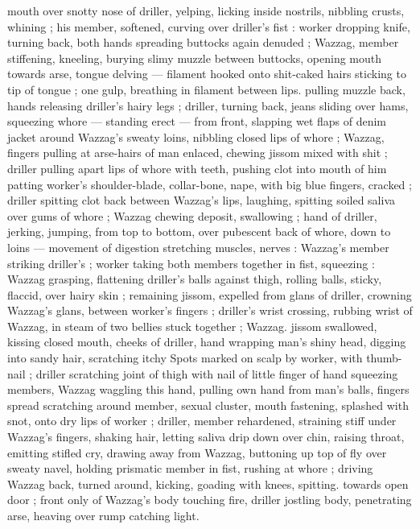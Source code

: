 mouth over snotty nose of driller, yelping, licking inside nostrils, 
nibbling crusts, whining ; his member, softened, curving over driller's 
fist : worker dropping knife, turning back, both hands spreading 
buttocks again denuded ; Wazzag, member stiffening, kneeling, 
burying slimy muzzle between buttocks, opening mouth towards 
arse, tongue delving --- filament hooked onto shit-caked hairs 
sticking to tip of tongue ; one gulp, breathing in filament between 
lips. pulling muzzle back, hands releasing driller's hairy legs ; driller, 
turning back, jeans sliding over hams, squeezing whore --- standing 
erect --- from front, slapping wet flaps of denim jacket around 
Wazzag's sweaty loins, nibbling closed lips of whore ; Wazzag, 
fingers pulling at arse-hairs of man enlaced, chewing jissom mixed 
with shit ; driller pulling apart lips of whore with teeth, pushing clot 
into mouth of him patting worker's shoulder-blade, collar-bone, 
nape, with big blue fingers, cracked ; driller spitting clot back 
between Wazzag's lips, laughing, spitting soiled saliva over gums of 
whore ; Wazzag chewing deposit, swallowing ; hand of driller, jerking, 
jumping, from top to bottom, over pubescent back of whore, down to 
loins --- movement of digestion stretching muscles, nerves : 
Wazzag's member striking driller's ; worker taking both members 
together in fist, squeezing : Wazzag grasping, flattening driller's 
balls against thigh, rolling balls, sticky, flaccid, over hairy skin ; 
remaining jissom, expelled from glans of driller, crowning Wazzag's 
glans, between worker's fingers ; driller's wrist crossing, rubbing 
wrist of Wazzag, in steam of two bellies stuck together ; Wazzag. 
jissom swallowed, kissing closed mouth, cheeks of driller, hand 
wrapping man's shiny head, digging into sandy hair, scratching itchy 
Spots marked on scalp by worker, with thumb-nail ; driller scratching 
joint of thigh with nail of little finger of hand squeezing members, 
Wazzag waggling this hand, pulling own hand from man's balls, 
fingers spread scratching around member, sexual cluster, mouth 
fastening, splashed with snot, onto dry lips of worker ; driller, 
member rehardened, straining stiff under Wazzag's fingers, shaking 
hair, letting saliva drip down over chin, raising throat, emitting stifled 
cry, drawing away from Wazzag, buttoning up top of fly over sweaty 
navel, holding prismatic member in fist, rushing at whore ; driving 
Wazzag back, turned around, kicking, goading with knees, spitting. 
towards open door ; front only of Wazzag's body touching fire, driller 
jostling body, penetrating arse, heaving over rump catching light. 
